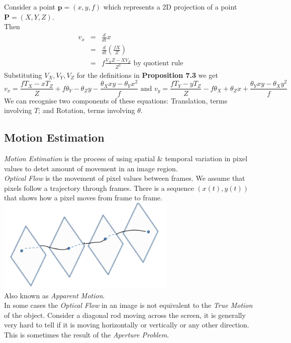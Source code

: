 \documentclass[11pt,a4paper]{article}
\begin{document}
Consider a point $\textbf{p}=(x,y,f)$ which represents a 2D projection of a point $\textbf{P}=(X,Y,Z)$.\\
Then
\[\begin{array}{rcl}
v_x&=&\frac{d}{dt}x\\
&=&\frac{d}{dt}\left(\frac{fX}{Z}\right)\\
&=&f\frac{V_XZ-XV_Z}{Z^2}\text{ by quotient rule}
\end{array}\]
Substituting $V_X,V_Y,V_Z$ for the definitions in \textbf{Proposition 7.3} we get
$$v_x=\frac{fT_X-xT_Z}{Z}+f\theta_Y-\theta_Zy-\frac{\theta_Xxy-\theta_Yx^2}{f}\text{ and }v_y=\frac{fT_Y-yT_Z}{Z}-f\theta_X+\theta_Zx+\frac{\theta_Yxy-\theta_Xy^2}{f}$$
We can recognise two components of these equations: Translation, terms involving $T$; and Rotation, terms involving $\theta$.

\subsection{Motion Estimation}

\textit{Motion Estimation} is the process of using spatial \& temporal variation in pixel values to detet amount of movement in an image region.\\

\textit{Optical Flow} is the movement of pixel values between frames. We assume that pixels follow a trajectory through frames. \ie There is a sequence $(x(t),y(t))$ that shows how a pixel moves from frame to frame.\\
\includegraphics[scale=.4]{img/apparentMotion.png}\\
\nb Also known as \textit{Apparent Motion}.\\

In some cases the \textit{Optical Flow} in an image is not equivalent to the \textit{True Motion} of the object. Consider a diagonal rod moving across the screen, it is generally very hard to tell if it is moving horizontally or vertically or any other direction.\\
\nb This is sometimes the result of the \textit{Aperture Problem}.\\
\end{document}
